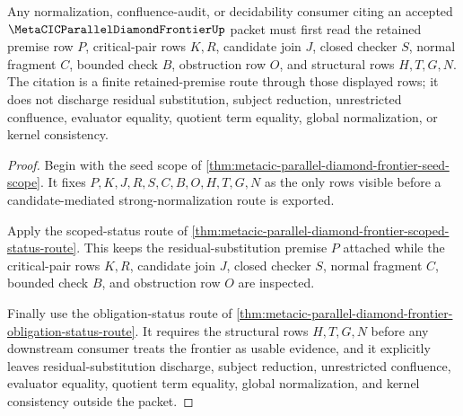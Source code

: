 \begin{theorem}
\label{thm:metacic-parallel-diamond-frontier-scoped-route-consumer}
Any normalization, confluence-audit, or decidability consumer citing an accepted $\MetaCICParallelDiamondFrontierUp$ packet must first read the retained premise row $P$, critical-pair rows $K,R$, candidate join $J$, closed checker $S$, normal fragment $C$, bounded check $B$, obstruction row $O$, and structural rows $H,T,G,N$. The citation is a finite retained-premise route through those displayed rows; it does not discharge residual substitution, subject reduction, unrestricted confluence, evaluator equality, quotient term equality, global normalization, or kernel consistency.
\end{theorem}
\begin{proof}
Begin with the seed scope of \autoref{thm:metacic-parallel-diamond-frontier-seed-scope}. It fixes $P,K,J,R,S,C,B,O,H,T,G,N$ as the only rows visible before a candidate-mediated strong-normalization route is exported.

Apply the scoped-status route of \autoref{thm:metacic-parallel-diamond-frontier-scoped-status-route}. This keeps the residual-substitution premise $P$ attached while the critical-pair rows $K,R$, candidate join $J$, closed checker $S$, normal fragment $C$, bounded check $B$, and obstruction row $O$ are inspected.

Finally use the obligation-status route of \autoref{thm:metacic-parallel-diamond-frontier-obligation-status-route}. It requires the structural rows $H,T,G,N$ before any downstream consumer treats the frontier as usable evidence, and it explicitly leaves residual-substitution discharge, subject reduction, unrestricted confluence, evaluator equality, quotient term equality, global normalization, and kernel consistency outside the packet.
\end{proof}
